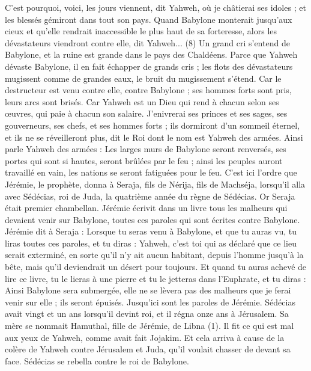 \begin{multicols}{2}
C'est pourquoi, voici, les jours viennent, dit Yahweh, où je châtierai ses idoles ; et les blessés gémiront dans tout son pays.
Quand Babylone monterait jusqu'aux cieux et qu'elle rendrait inaccessible le plus haut de sa forteresse, alors les dévastateurs viendront contre elle, dit Yahweh...\FTNT{} (8)
Un grand cri s'entend de Babylone, et la ruine est grande dans le pays des Chaldéens.
Parce que Yahweh dévaste Babylone, il en fait échapper de grands cris ; les flots des dévastateurs mugissent comme de grandes eaux, le bruit du mugissement s'étend.
Car le destructeur est venu contre elle, contre Babylone ; ses hommes forts sont pris, leurs arcs sont brisés. Car Yahweh est un Dieu qui rend à chacun selon ses œuvres, qui paie à chacun son salaire.
J'enivrerai ses princes et ses sages, ses gouverneurs, ses chefs, et ses hommes forts ; ils dormiront d'un sommeil éternel, et ils ne se réveilleront plus, dit le Roi dont le nom est Yahweh des armées.
Ainsi parle Yahweh des armées : Les larges murs de Babylone seront renversés, ses portes qui sont si hautes, seront brûlées par le feu ; ainsi les peuples auront travaillé en vain, les nations se seront fatiguées pour le feu.
C'est ici l'ordre que Jérémie, le prophète, donna à Seraja, fils de Nérija, fils de Machséja, lorsqu'il alla avec Sédécias, roi de Juda, la quatrième année du règne de Sédécias. Or Seraja était premier chambellan.
Jérémie écrivit dans un livre tous les malheurs qui devaient venir sur Babylone, toutes ces paroles qui sont écrites contre Babylone.
Jérémie dit à Seraja : Lorsque tu seras venu à Babylone, et que tu auras vu, tu liras toutes ces paroles,
et tu diras : Yahweh, c'est toi qui as déclaré que ce lieu serait exterminé, en sorte qu'il n'y ait aucun habitant, depuis l'homme jusqu'à la bête, mais qu'il deviendrait un désert pour toujours.
Et quand tu auras achevé de lire ce livre, tu le lieras à une pierre et tu le jetteras dans l'Euphrate,
et tu diras : Ainsi Babylone sera submergée, elle ne se lèvera pas des malheurs que je ferai venir sur elle ; ils seront épuisés. Jusqu'ici sont les paroles de Jérémie.
\VerseOne{}Sédécias avait vingt et un ans lorsqu'il devint roi, et il régna onze ans à Jérusalem. Sa mère se nommait Hamuthal, fille de Jérémie, de Libna\FTNT{} (1).
Il fit ce qui est mal aux yeux de Yahweh, comme avait fait Jojakim.
Et cela arriva à cause de la colère de Yahweh contre Jérusalem et Juda, qu'il voulait chasser de devant sa face. Sédécias se rebella contre le roi de Babylone.

\end{multicols}
